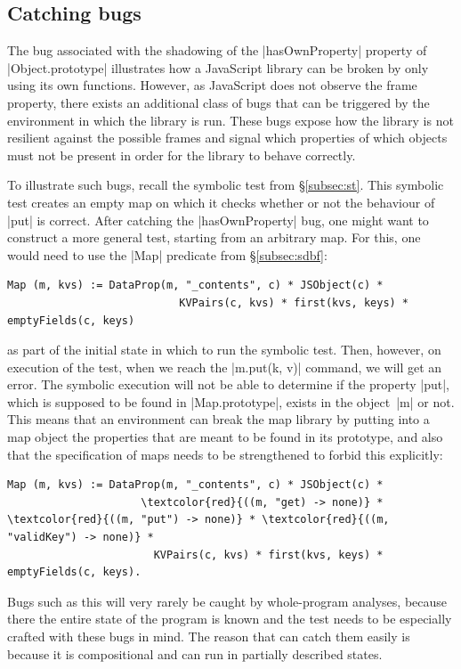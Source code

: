 \subsection{Catching  bugs}

The bug associated with the shadowing of the \jsinline|hasOwnProperty| property of \jsinline|Object.prototype| illustrates how a JavaScript library can be broken by only using its own functions. However, as JavaScript does not observe the frame property, there exists an additional class of bugs that can be triggered by the environment in which the library is run. These bugs expose how the library is not resilient against the possible frames and signal which properties of which objects must not be present in order for the library to behave correctly.

To illustrate such bugs, recall the symbolic test from \S\ref{subsec:st}. This symbolic test creates an empty map on which it checks whether or not the behaviour of \jsinline|put| is correct. After catching the \jsinline|hasOwnProperty| bug, one might want to construct a more general test, starting from an arbitrary map. For this, one would need to use the \jsinline|Map| predicate from \S\ref{subsec:sdbf}:

\begin{Verbatim}[fontsize=\footnotesize,commandchars=\\\{\}]
         Map (m, kvs) := DataProp(m, "_contents", c) * JSObject(c) * 
                           KVPairs(c, kvs) * first(kvs, keys) * emptyFields(c, keys)
\end{Verbatim}

\noindent as part of the initial state in which to run the symbolic test. Then, however, on execution of the test, when we reach the \jsinline|m.put(k, v)| command, we will get an error. The symbolic execution will not be able to determine if the property \jsinline|put|, which is supposed to be found in \jsinline|Map.prototype|, exists in the object~\jsinline|m| or not. This means that an environment can break the map library by putting into a map object the properties that are meant to be found in its prototype, and also that the specification of maps needs to be strengthened to forbid this explicitly:
\begin{Verbatim}[fontsize=\footnotesize,commandchars=\\\{\}]
   Map (m, kvs) := DataProp(m, "_contents", c) * JSObject(c) * 
                     \textcolor{red}{((m, "get) -> none)} * \textcolor{red}{((m, "put") -> none)} * \textcolor{red}{((m, "validKey") -> none)} *
                       KVPairs(c, kvs) * first(kvs, keys) * emptyFields(c, keys).
\end{Verbatim}

Bugs such as this will very rarely be caught by whole-program analyses, because there the entire state of the program is known and the test needs to be especially crafted with these bugs in mind. The reason that \cosette can catch them easily is because it is compositional and can run in partially described states.
